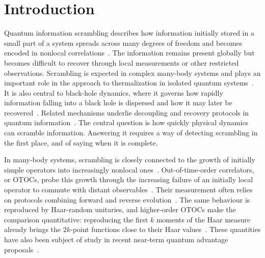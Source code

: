 \documentclass[
    aps,
    superscriptaddress,
    onecolumn,
    10pt,
    prx,
    nofootinbib
]{revtex4-2}
\newcommand{\nocontentsline}[3]{}
\newcommand\stoptoc{\let\addcontentsline\nocontentsline}
\theoremstyle{namedstatement}
\theoremstyle{plain}
\begin{document}
\maketitle

\stoptoc


\section{Introduction}
Quantum information scrambling describes how information initially stored in a
small part of a system spreads across many degrees of freedom and becomes
encoded in nonlocal correlations~\cite{SekinoSusskind2008,LashkariEtAl2013}. The
information remains present globally but becomes difficult to recover through
local measurements or other restricted observations. Scrambling is expected in
complex many-body systems and plays an important role in the approach to
thermalization in isolated quantum systems~\cite{Deutsch1991,Srednicki_1994,Rigol_2008}.
It is also central to black-hole dynamics, where it governs how rapidly
information falling into a black hole is dispersed and how it may later be
recovered~\cite{HaydenPreskill2007}. Related mechanisms underlie decoupling and
recovery protocols in quantum information~\cite{BrownFawzi2012,BrownFawzi2015}.
The central question is how quickly physical dynamics can scramble information.
Answering it requires a way of detecting scrambling in the first place, and of
saying when it is complete.

In many-body systems, scrambling is closely connected to the growth of initially
simple operators into increasingly nonlocal ones~\cite{ShenkerStanford2014,RobertsStanford2015,NahumVijayHaah2018}.
Out-of-time-order correlators, or OTOCs, probe this growth through the
increasing failure of an initially local operator to commute with distant
observables~\cite{LarkinOvchinnikov1969,Kitaev2015,RobertsStanford2015}. Their
measurement often relies on protocols combining forward and reverse
evolution~\cite{SwingleEtAl2016,GarttnerEtAl2017}. The same behaviour is
reproduced by Haar-random unitaries, and higher-order OTOCs make the comparison
quantitative: reproducing the first $k$ moments of the Haar measure already
brings the $2k$-point functions close to their Haar
values~\cite{HosurEtAl2016,RobertsYoshida2017}. These quantities have also been subject of study in recent near-term quantum advantage proposals~\cite{king2025simplifiedversionquantumotoc2,abanin2025constructiveinterferenceedgequantum}. 
\end{document}
